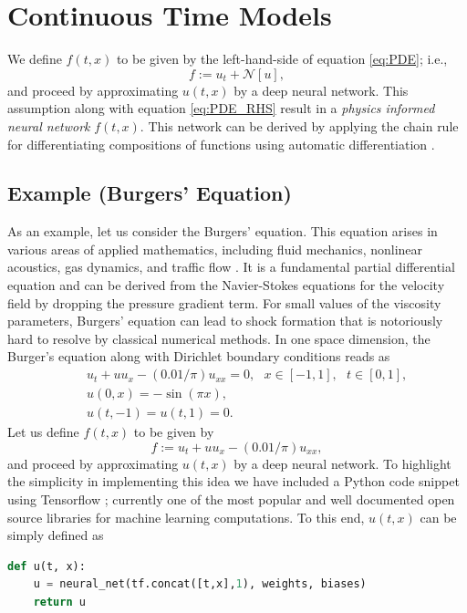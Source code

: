 \documentclass[preprint,12pt]{elsarticle}
\begin{document}
\section{Continuous Time Models}
We define $f(t,x)$ to be given by the left-hand-side of equation \eqref{eq:PDE}; i.e.,
\begin{equation}
f := u_t + \mathcal{N}[u],\label{eq:PDE_RHS}
\end{equation}
and proceed by approximating $u(t,x)$ by a deep neural network. This assumption along with equation \eqref{eq:PDE_RHS} result in a \emph{physics informed neural network} $f(t,x)$. This network can be derived by applying the chain rule for differentiating compositions of functions using automatic differentiation \cite{baydin2015automatic}.

\subsection{Example (Burgers' Equation)}
As an example, let us consider the Burgers' equation. This equation arises in various areas of applied mathematics, including fluid mechanics, nonlinear acoustics, gas dynamics, and traffic flow \cite{basdevant1986spectral}. It is a fundamental partial differential equation and can be derived from the Navier-Stokes equations for the velocity field by dropping the pressure gradient term. For small values of the viscosity parameters, Burgers' equation can lead to shock formation that is notoriously hard to resolve by classical numerical methods. In one space dimension, the Burger's equation along with Dirichlet boundary conditions reads as
\begin{eqnarray}\label{eq:Burgers}
&& u_t + u u_x - (0.01/\pi) u_{xx} = 0,\ \ \ x \in [-1,1],\ \ \ t \in [0,1],\\
&& u(0,x) = -\sin(\pi x),\nonumber\\
&& u(t,-1) = u(t,1) = 0.\nonumber
\end{eqnarray}
Let us define $f(t,x)$ to be given by
\[
f := u_t + u u_x - (0.01/\pi) u_{xx},
\]
and proceed by approximating $u(t,x)$ by a deep neural network. To highlight the simplicity in implementing this idea we have included a  Python code snippet using Tensorflow \cite{abadi2016tensorflow}; currently one of the most popular and well documented open source libraries for machine learning computations. To this end, $u(t,x)$ can be simply defined as
\begin{lstlisting}[language=Python]
def u(t, x):
    u = neural_net(tf.concat([t,x],1), weights, biases)
    return u
\end{lstlisting}
\end{document}
